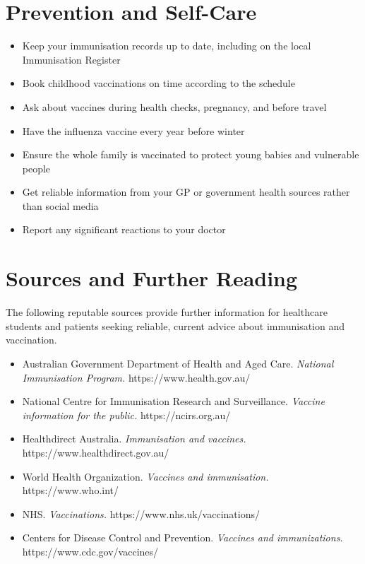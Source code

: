\section*{Prevention and Self-Care}
\begin{itemize}
    \item Keep your immunisation records up to date, including on the local Immunisation Register
    \item Book childhood vaccinations on time according to the schedule
    \item Ask about vaccines during health checks, pregnancy, and before travel
    \item Have the influenza vaccine every year before winter
    \item Ensure the whole family is vaccinated to protect young babies and vulnerable people
    \item Get reliable information from your GP or government health sources rather than social media
    \item Report any significant reactions to your doctor
\end{itemize}

\section*{Sources and Further Reading}
The following reputable sources provide further information for healthcare students and patients seeking reliable, current advice about immunisation and vaccination.
\begin{itemize}
    \item Australian Government Department of Health and Aged Care. \textit{National Immunisation Program.} https://www.health.gov.au/
    \item National Centre for Immunisation Research and Surveillance. \textit{Vaccine information for the public.} https://ncirs.org.au/
    \item Healthdirect Australia. \textit{Immunisation and vaccines.} https://www.healthdirect.gov.au/
    \item World Health Organization. \textit{Vaccines and immunisation.} https://www.who.int/
    \item NHS. \textit{Vaccinations.} https://www.nhs.uk/vaccinations/
    \item Centers for Disease Control and Prevention. \textit{Vaccines and immunizations.} https://www.cdc.gov/vaccines/
\end{itemize}
